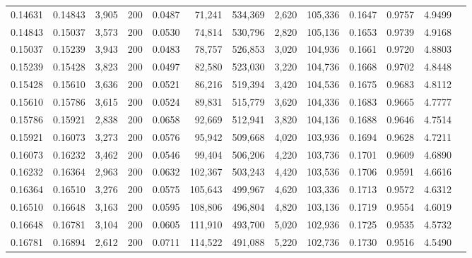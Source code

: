 \begin{tabular}{rrrrrrrrrrrrr}
0.14631 & 0.14843 & 3,905 & 200 &                                     0.0487 &  71,241 & 534,369 &   2,620 & 105,336 & 0.1647 & 0.9757 & 4.9499 \\
0.14843 & 0.15037 & 3,573 & 200 &                                     0.0530 &  74,814 & 530,796 &   2,820 & 105,136 & 0.1653 & 0.9739 & 4.9168 \\
0.15037 & 0.15239 & 3,943 & 200 &                                     0.0483 &  78,757 & 526,853 &   3,020 & 104,936 & 0.1661 & 0.9720 & 4.8803 \\
0.15239 & 0.15428 & 3,823 & 200 &                                     0.0497 &  82,580 & 523,030 &   3,220 & 104,736 & 0.1668 & 0.9702 & 4.8448 \\
0.15428 & 0.15610 & 3,636 & 200 &                                     0.0521 &  86,216 & 519,394 &   3,420 & 104,536 & 0.1675 & 0.9683 & 4.8112 \\
0.15610 & 0.15786 & 3,615 & 200 &                                     0.0524 &  89,831 & 515,779 &   3,620 & 104,336 & 0.1683 & 0.9665 & 4.7777 \\
0.15786 & 0.15921 & 2,838 & 200 &                                     0.0658 &  92,669 & 512,941 &   3,820 & 104,136 & 0.1688 & 0.9646 & 4.7514 \\
0.15921 & 0.16073 & 3,273 & 200 &                                     0.0576 &  95,942 & 509,668 &   4,020 & 103,936 & 0.1694 & 0.9628 & 4.7211 \\
0.16073 & 0.16232 & 3,462 & 200 &                                     0.0546 &  99,404 & 506,206 &   4,220 & 103,736 & 0.1701 & 0.9609 & 4.6890 \\
0.16232 & 0.16364 & 2,963 & 200 &                                     0.0632 & 102,367 & 503,243 &   4,420 & 103,536 & 0.1706 & 0.9591 & 4.6616 \\
0.16364 & 0.16510 & 3,276 & 200 &                                     0.0575 & 105,643 & 499,967 &   4,620 & 103,336 & 0.1713 & 0.9572 & 4.6312 \\
0.16510 & 0.16648 & 3,163 & 200 &                                     0.0595 & 108,806 & 496,804 &   4,820 & 103,136 & 0.1719 & 0.9554 & 4.6019 \\
0.16648 & 0.16781 & 3,104 & 200 &                                     0.0605 & 111,910 & 493,700 &   5,020 & 102,936 & 0.1725 & 0.9535 & 4.5732 \\
0.16781 & 0.16894 & 2,612 & 200 &                                     0.0711 & 114,522 & 491,088 &   5,220 & 102,736 & 0.1730 & 0.9516 & 4.5490 \\

\end{tabular}
